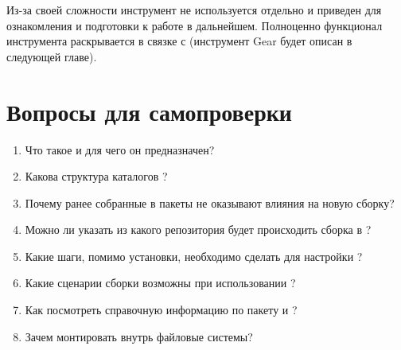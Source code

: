 Из-за своей сложности инструмент не используется отдельно и приведен для ознакомления и
подготовки к работе в дальнейшем. Полноценно функционал инструмента раскрывается в связке
с (инструмент Gear будет описан в следующей главе).

\section{Вопросы для самопроверки}

\begin{enumerate}
	\item Что такое  и для чего он предназначен?
	\item Какова структура каталогов ?
	\item Почему ранее собранные в  пакеты не оказывают влияния на новую сборку?
	\item Можно ли указать из какого репозитория будет происходить сборка в ?
	\item Какие шаги, помимо установки, необходимо сделать для настройки ?
	\item Какие сценарии сборки возможны при использовании ?
	\item Как посмотреть справочную информацию по пакету  и ?
	\item Зачем монтировать внутрь  файловые системы?
\end{enumerate}